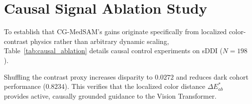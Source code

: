 \documentclass[runningheads]{llncs}
\begin{document}
\section{Causal Signal Ablation Study}
To establish that CG-MedSAM's gains originate specifically from localized color-contrast physics rather than arbitrary dynamic scaling, Table~\ref{tab:causal_ablation} details causal control experiments on sDDI ($N=198$).

\begin{table}[t]
\centering
\caption{Causal signal ablation study evaluating physical contrast conditioning on sDDI ($N=198$). Bold denotes optimal fairness.}
\label{tab:causal_ablation}
\end{table}

Shuffling the contrast proxy increases disparity to $0.0272$ and reduces dark cohort performance ($0.8234$). This verifies that the localized color distance $\Delta E^*_{ab}$ provides active, causally grounded guidance to the Vision Transformer.
\end{document}
